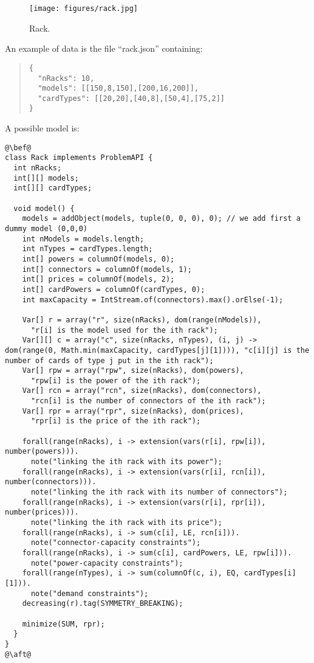 \documentclass[10pt]{article}
\begin{document}
\begin{figure}[h]
\begin{center}
  \texttt{[image: figures/rack.jpg]}
\end{center}
\caption{Rack.\label{fig:rack}}
\end{figure}

An example of data is the file ``rack.json'' containing:

{\small
\begin{quote}
\begin{verbatim}
{
  "nRacks": 10,
  "models": [[150,8,150],[200,16,200]],
  "cardTypes": [[20,20],[40,8],[50,4],[75,2]]
}
\end{verbatim}
\end{quote}
}

A possible model is:

\begin{lstlisting}
@\bef@
class Rack implements ProblemAPI {
  int nRacks;
  int[][] models; 
  int[][] cardTypes;

  void model() {
    models = addObject(models, tuple(0, 0, 0), 0); // we add first a dummy model (0,0,0)
    int nModels = models.length;
    int nTypes = cardTypes.length;
    int[] powers = columnOf(models, 0);
    int[] connectors = columnOf(models, 1);
    int[] prices = columnOf(models, 2);
    int[] cardPowers = columnOf(cardTypes, 0);
    int maxCapacity = IntStream.of(connectors).max().orElse(-1);
    
    Var[] r = array("r", size(nRacks), dom(range(nModels)),
      "r[i] is the model used for the ith rack");
    Var[][] c = array("c", size(nRacks, nTypes), (i, j) -> dom(range(0, Math.min(maxCapacity, cardTypes[j][1]))), "c[i][j] is the number of cards of type j put in the ith rack");
    Var[] rpw = array("rpw", size(nRacks), dom(powers),
      "rpw[i] is the power of the ith rack");
    Var[] rcn = array("rcn", size(nRacks), dom(connectors),
      "rcn[i] is the number of connectors of the ith rack");
    Var[] rpr = array("rpr", size(nRacks), dom(prices),
      "rpr[i] is the price of the ith rack");
    
    forall(range(nRacks), i -> extension(vars(r[i], rpw[i]), number(powers))).
      note("linking the ith rack with its power");
    forall(range(nRacks), i -> extension(vars(r[i], rcn[i]), number(connectors))).
      note("linking the ith rack with its number of connectors");
    forall(range(nRacks), i -> extension(vars(r[i], rpr[i]), number(prices))).
      note("linking the ith rack with its price");
    forall(range(nRacks), i -> sum(c[i], LE, rcn[i])).
      note("connector-capacity constraints");
    forall(range(nRacks), i -> sum(c[i], cardPowers, LE, rpw[i])).
      note("power-capacity constraints");
    forall(range(nTypes), i -> sum(columnOf(c, i), EQ, cardTypes[i][1])).
      note("demand constraints");
    decreasing(r).tag(SYMMETRY_BREAKING);
    
    minimize(SUM, rpr);
  }
}
@\aft@
\end{lstlisting}
\end{document}
